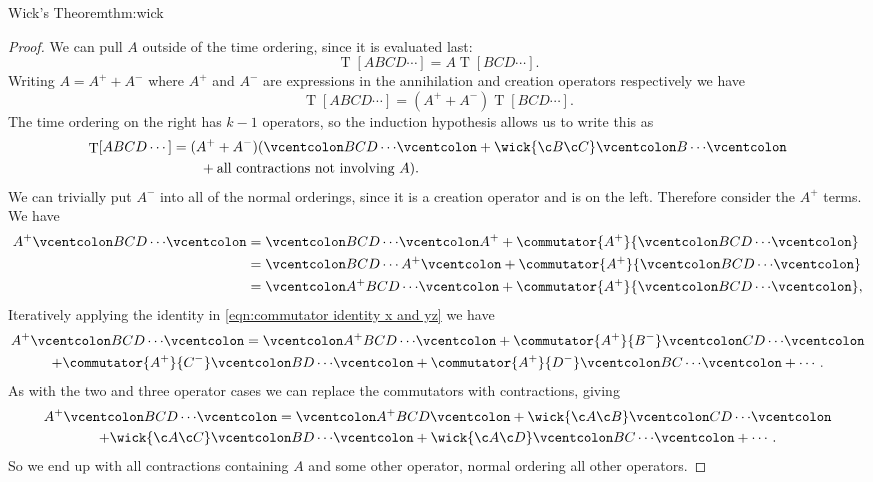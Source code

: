 \documentclass[fleqn]{NotesClass}
\newcommand{\normalordering}[1]{\mathopen{\vcentcolon}{#1}\mathclose{\vcentcolon}}
\DeclareMathOperator{\timeOrdering}{T}
\begin{document}
\begin{thm}{Wick's Theorem}{thm:wick}
\begin{proof}
            We can pull \(A\) outside of the time ordering, since it is evaluated last:
            \begin{equation}
                \timeOrdering[ABCD\dotsm] = A\timeOrdering[BCD\dotsm].
            \end{equation}
            Writing \(A = A^+ + A^-\) where \(A^+\) and \(A^-\) are expressions in the annihilation and creation operators respectively we have
            \begin{equation}
                \timeOrdering[ABCD\dotsm] = (A^+ + A^-)\timeOrdering[BCD\dotsm].
            \end{equation}
            The time ordering on the right has \(k - 1\) operators, so the induction hypothesis allows us to write this as
            \begin{align}
                \timeOrdering[ABCD\dotsm] &= (A^+ + A^-)(\normalordering{BCD\dotsm} + \wick{\c B \c C}\normalordering{B \dotsm}\\
                &\qquad+ \text{all contractions not involving \(A\)}).
            \end{align}
            We can trivially put \(A^-\) into all of the normal orderings, since it is a creation operator and is on the left.
            Therefore consider the \(A^+\) terms.
            We have
            \begin{align}
                A^+ \normalordering{BCD\dotsm} &= \normalordering{BCD\dotsm}A^+ + \commutator{A^+}{\normalordering{BCD\dotsm}}\\
                &= \normalordering{BCD\dotsm A^+} + \commutator{A^+}{\normalordering{BCD\dotsm}}\\
                &= \normalordering{A^+BCD\dotsm} + \commutator{A^+}{\normalordering{BCD\dotsm}},
            \end{align}
            Iteratively applying the identity in \cref{eqn:commutator identity x and yz} we have
            \begin{multline}
                A^+\normalordering{BCD\dotsm} = \normalordering{A^+BCD\dotsm} + \commutator{A^+}{B^-}\normalordering{CD\dotsm}\\
                + \commutator{A^+}{C^-} \normalordering{BD\dotsm} + \commutator{A^+}{D^-}\normalordering{BC\dotsm} + \dotsb.
            \end{multline}
            As with the two and three operator cases we can replace the commutators with contractions, giving
            \begin{multline}
                A^+\normalordering{BCD\dotsm} = \normalordering{A^+BCD} + \wick{\c A \c B}\normalordering{CD\dotsm}\\
                + \wick{\c A \c C}\normalordering{BD\dotsm} +  \wick{\c A \c D}\normalordering{BC\dotsm} + \dotsb.
            \end{multline}
            So we end up with all contractions containing \(A\) and some other operator, normal ordering all other operators.
            

\end{proof}
\end{thm}
\end{document}
